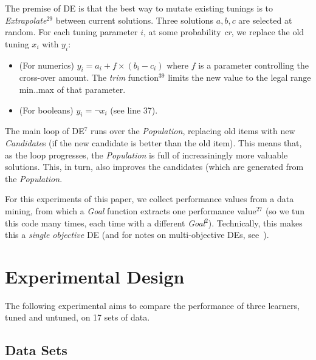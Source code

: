 \documentclass{sig-alternative}
\newcommand{\bi}{\begin{itemize}[leftmargin=0.4cm]}
\newcommand{\ei}{\end{itemize}}
\begin{document}
The premise of DE  is that the best way to mutate existing tunings
is to {\em Extrapolate}$^{29}$
between current solutions.  Three solutions $a,b,c$ are selected at random.
For each tuning parameter $i$, at some probability {\em cr}, we replace
the old tuning $x_i$ with $y_i$:
\bi
\item (For numerics) $y_i = a_i+f \times (b_i - c_i)$   where $f$ is a parameter
controlling the cross-over amount.  The {\em trim} function$^{39}$ limits the new
value to the legal range min..max of that parameter.
\item (For booleans) $y_i= \neg x_i$ (see line 37).
\ei
The main loop of DE$^7$ runs over the {\em Population}, replacing old items
with new {\em Candidate}s (if the new candidate is better than the old item).
This means that, as the loop progresses, the {\em Population} is full of increasiningly
more valuable solutions. This, in turn, also improves  the candidates (which are generated
from the {\em Population}.

For this experiments of this paper, we collect performance
values from a data mining, from which a {\em Goal} function extracts one 
performance value$^{27}$ (so we tun this code many times, each time with
a different {\em Goal}$^2$).  Technically, this makes this a  {\em single objective} DE (and for notes on multi-objective DEs, see~\cite{Coello05,zhang07,5583335}).






\section{Experimental Design}

The following experimental aims to compare the performance of three learners, tuned and untuned, on 17
sets of data. 

\subsection{Data Sets}
\end{document}
